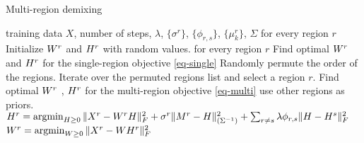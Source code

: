 \begin{algorithm}[tbh]
   \caption{Multi-region demixing}
   \label{alg:multimix}
   \begin{algorithmic}[1]
    training data $X$, number of steps, $\lambda$, $\{\sigma^r\}$, $\{\phi_{r,s}\}$, $\{\mu^r_k\}$, $\Sigma$
    for every region $r$
   \STATE \quad Initialize $W^r$ and ${H}^r$ with random values.
    for every region $r$ 
   \STATE \quad Find optimal $W^r$ and ${H}^r$ for the single-region objective \eqref{eq-single}
   \REPEAT
   \STATE Randomly permute the order of the regions.
   \STATE Iterate over the permuted regions list and select a region $r$.
   \STATE \quad Find optimal $W^r$ , ${H}^r$ for the multi-region objective \eqref{eq-multi} use other regions as priors.
   \STATE \quad $H^r = \argmin_{H \geq 0 } \| X^r - W^rH\|^2_F + \sigma^r \| M^r - \H \|^2_{(\Sigma^{-1})} + \sum_{r \neq s} \lambda \phi_{r , s} \| \H - \H^s \|_F^2  $
   \STATE \quad $ W^r = \argmin_{W \geq 0} \| X^r - WH^r\|^2_F $
\end{algorithmic}
\end{algorithm}


